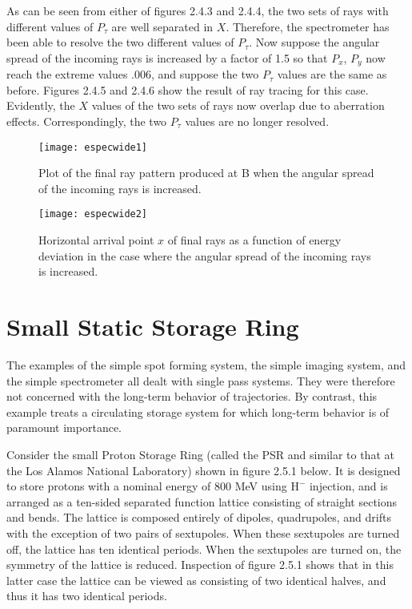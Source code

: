 As can be seen from either of figures 2.4.3 and 2.4.4, the two sets of rays
with different values of $P_{\tau}$  are well separated in $X$.  Therefore, the
spectrometer has been able to resolve the two different values of $P_{\tau}$.
Now suppose the angular spread of the incoming rays is increased by a
factor of 1.5 so that $P_x$, $P_y$  now reach the extreme values  .006, and
suppose the two $P_{\tau}$  values are the same as before.  Figures 2.4.5
and 2.4.6 show the
result of ray tracing for this case.  Evidently, the $X$ values of the two
sets of rays now overlap due to aberration effects.  Correspondingly, the
two $P_{\tau}$  values are no longer resolved.


\begin{figure}[hbp]
  \centering
  \texttt{[image: especwide1]}
  \caption{Plot of the final ray pattern produced at B
          when the angular spread of the incoming rays is increased.}
\end{figure}


\begin{figure}[hbp]
  \centering
  \texttt{[image: especwide2]}
  \caption{Horizontal arrival point $x$ of final rays
           as a function of energy deviation in the case where
           the angular spread of the incoming rays is increased.}
\end{figure}
\clearpage

\section{Small Static Storage Ring}
\label{staticstorage}
     The examples of the simple spot forming system, the simple imaging
system, and the simple spectrometer all dealt with single pass systems.
They were therefore not concerned with the long-term behavior of
trajectories.  By contrast, this example treats a circulating storage
system for which long-term behavior is of paramount importance.

     Consider the small Proton Storage Ring (called the PSR and similar to that at the Los
Alamos National Laboratory) shown in figure 2.5.1 below.  It is designed to
store protons with a nominal energy of 800 MeV using $\mbox{H}^-$  injection, and is
arranged as a ten-sided separated function lattice consisting of straight
sections and bends.  The lattice is composed entirely of dipoles,
quadrupoles, and drifts with the exception of two pairs of sextupoles.
When these sextupoles are turned off, the lattice has ten identical
periods.  When the sextupoles are turned on, the symmetry of the lattice is
reduced.  Inspection of figure 2.5.1 shows that in this latter case the
lattice can be viewed as consisting of two identical halves, and thus it
has two identical periods.

